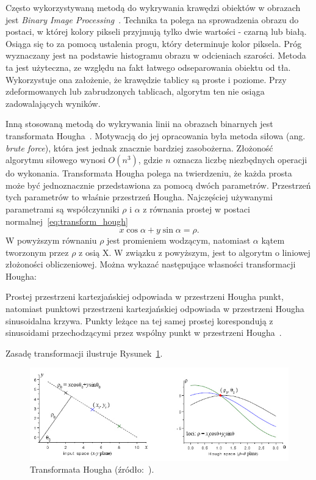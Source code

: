 Często wykorzystywaną metodą do wykrywania krawędzi obiektów w obrazach jest \textit{Binary Image Processing}~\cite{4310039}.
Technika ta polega na sprowadzenia obrazu do postaci, w której kolory pikseli przyjmują tylko dwie wartości - czarną lub białą.
Osiąga się to za pomocą ustalenia progu, który determinuje kolor piksela.
Próg wyznaczany jest na podstawie histogramu obrazu w odcieniach szarości.
Metoda ta jest użyteczna, ze względu na fakt łatwego odseparowania obiektu od tła.
Wykorzystuje ona założenie, że krawędzie tablicy są proste i poziome.
Przy zdeformowanych lub zabrudzonych tablicach, algorytm ten nie osiąga zadowalających wyników.

Inną stosowaną metodą do wykrywania linii na obrazach binarnych jest transformata Hougha~\cite{DuanBuildingAA}.
Motywacją do jej opracowania była metoda siłowa (ang. \textit{brute force}), która jest jednak znacznie bardziej zasobożerna.
Złożoność algorytmu siłowego wynosi $O(n^3)$, gdzie $n$ oznacza liczbę niezbędnych operacji do wykonania.
Transformata Hougha polega na twierdzeniu, że każda prosta może być jednoznacznie przedstawiona za pomocą dwóch parametrów.
Przestrzeń tych parametrów to właśnie przestrzeń Hougha.
Najczęściej używanymi parametrami są współczynniki $\rho$ i $\alpha$ z równania prostej w postaci normalnej~\eqref{eq:transform_hough}
\begin{equation}
    \label{eq:transform_hough}
    x\cos{\alpha} + y\sin{\alpha} = \rho.
\end{equation}
W powyższym równaniu $\rho$ jest promieniem wodzącym, natomiast $\alpha$ kątem tworzonym przez $\rho$ z osią X.
W związku z powyższym, jest to algorytm o liniowej złożoności obliczeniowej.
Można wykazać następujące własności transformacji Hougha:\\
\begin{theorem}
    Prostej przestrzeni kartezjańskiej odpowiada w przestrzeni Hougha punkt, natomiast
    punktowi przestrzeni kartezjańskiej odpowiada w przestrzeni Hougha sinusoidalna krzywa.
    Punkty leżące na tej samej prostej korespondują z sinusoidami przechodzącymi przez
    wspólny punkt w przestrzeni Hougha~\cite{hough_transform_definition}.
\end{theorem}
Zasadę transformacji ilustruje Rysunek~\ref{fig:hough_transform}.
\begin{figure}[!ht]
    \centering
    \includegraphics[scale=1]{Pictures/hough_transform.jpeg}
    \caption{Transformata Hougha (źródło:~\cite{Lin:01}).}
    \label{fig:hough_transform}
\end{figure}
\FloatBarrier

